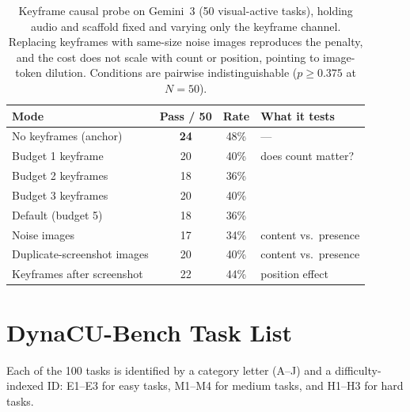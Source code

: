 \documentclass[11pt]{article}
\begin{document}
\begin{table}[!h]
\centering
\caption{Keyframe causal probe on Gemini~3 (50 visual-active tasks), holding audio
and scaffold fixed and varying only the keyframe channel. Replacing keyframes with
same-size noise images reproduces the penalty, and the cost does not scale with
count or position, pointing to image-token dilution. Conditions are pairwise
indistinguishable ($p\geq0.375$ at $N{=}50$).}
\label{tab:keyframe_probe}
\small
\setlength{\tabcolsep}{4pt}
\begin{tabular}{@{}l cc l@{}}
\toprule
\textbf{Mode} & \textbf{Pass / 50} & \textbf{Rate} & \textbf{What it tests} \\
\midrule
No keyframes (anchor)        & \textbf{24} & 48\% & --- \\
Budget 1 keyframe            & 20 & 40\% & does count matter? \\
Budget 2 keyframes           & 18 & 36\% & \\
Budget 3 keyframes           & 20 & 40\% & \\
Default (budget 5)           & 18 & 36\% & \\
Noise images                 & 17 & 34\% & content vs.\ presence \\
Duplicate-screenshot images  & 20 & 40\% & content vs.\ presence \\
Keyframes after screenshot   & 22 & 44\% & position effect \\
\bottomrule
\end{tabular}
\end{table}

\section{DynaCU-Bench Task List}
\label{app:tasklist}

Each of the 100 tasks is identified by a category letter (A--J) and a difficulty-indexed ID: E1--E3 for easy tasks, M1--M4 for medium tasks, and H1--H3 for hard tasks.
\end{document}
